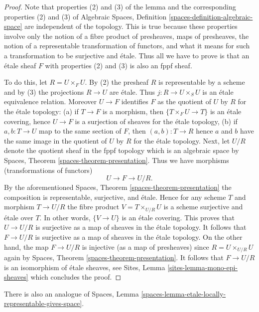 \begin{proof}
Note that properties (2) and (3) of the lemma and the corresponding
properties (2) and (3) of
Algebraic Spaces, Definition \ref{spaces-definition-algebraic-space}
are independent of the topology. This is true because these properties
involve only the notion of a fibre product of presheaves, maps of
presheaves, the notion of a representable transformation of functors,
and what it means for such a transformation to be surjective and \'etale.
Thus all we have to prove is that an \'etale sheaf $F$ with properties
(2) and (3) is also an fppf sheaf.

\medskip\noindent
To do this, let $R = U \times_F U$. By (2) the presheaf $R$ is representable
by a scheme and by (3) the projections $R \to U$ are \'etale. Thus
$j : R \to U \times_S U$ is an \'etale equivalence relation. Moreover
$U \to F$ identifies $F$ as the quotient of $U$ by $R$ for the
\'etale topology: (a) if $T \to F$ is a morphism, then $\{T \times_F U \to T\}$
is an \'etale covering, hence $U \to F$ is a surjection of sheaves for the
\'etale topology, (b) if $a, b : T \to U$ map to the same section of $F$,
then $(a, b) : T \to R$ hence $a$ and $b$ have the same image in the quotient
of $U$ by $R$ for the \'etale topology. Next, let $U/R$ denote the quotient
sheaf in the fppf topology which is an algebraic space by
Spaces, Theorem \ref{spaces-theorem-presentation}.
Thus we have morphisms (transformations of functors)
$$
U \to F \to U/R.
$$
By the aforementioned
Spaces, Theorem \ref{spaces-theorem-presentation}
the composition is representable, surjective, and \'etale. Hence for any
scheme $T$ and morphism $T \to U/R$ the fibre product $V = T \times_{U/R} U$
is a scheme surjective and \'etale over $T$. In other words, $\{V \to U\}$
is an \'etale covering. This proves that $U \to U/R$ is surjective as
a map of sheaves in the \'etale topology. It follows that
$F \to U/R$ is surjective as a map of sheaves in the \'etale topology.
On the other hand, the map $F \to U/R$ is injective (as a map of presheaves)
since $R = U \times_{U/R} U$ again by
Spaces, Theorem \ref{spaces-theorem-presentation}.
It follows that $F \to U/R$ is an isomorphism of \'etale sheaves, see
Sites, Lemma \ref{sites-lemma-mono-epi-sheaves}
which concludes the proof.
\end{proof}

\noindent
There is also an analogue of
Spaces, Lemma \ref{spaces-lemma-etale-locally-representable-gives-space}.


